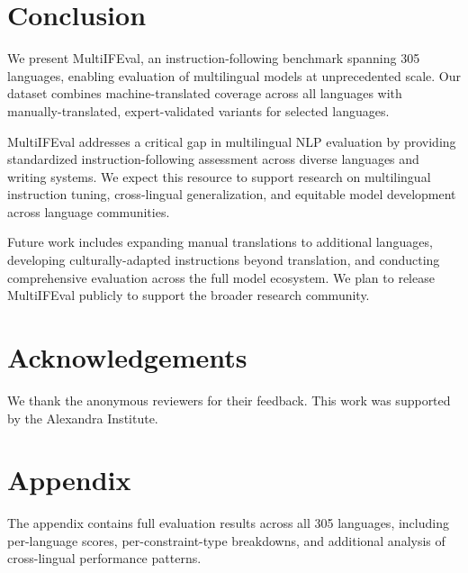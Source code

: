 \documentclass[11pt]{article}
\begin{document}
\section{Conclusion}
\label{sec:conclusion}

We present MultiIFEval, an instruction-following benchmark spanning 305 languages, enabling evaluation of multilingual models at unprecedented scale. Our dataset combines machine-translated coverage across all languages with manually-translated, expert-validated variants for selected languages.

MultiIFEval addresses a critical gap in multilingual NLP evaluation by providing standardized instruction-following assessment across diverse languages and writing systems. We expect this resource to support research on multilingual instruction tuning, cross-lingual generalization, and equitable model development across language communities.

Future work includes expanding manual translations to additional languages, developing culturally-adapted instructions beyond translation, and conducting comprehensive evaluation across the full model ecosystem. We plan to release MultiIFEval publicly to support the broader research community.

\section{Acknowledgements}
\label{sec:acknowledgements}

We thank the anonymous reviewers for their feedback. This work was supported by the Alexandra Institute.



\appendix

\section{Appendix}
\label{sec:appendix}

The appendix contains full evaluation results across all 305 languages, including per-language scores, per-constraint-type breakdowns, and additional analysis of cross-lingual performance patterns.
\end{document}
